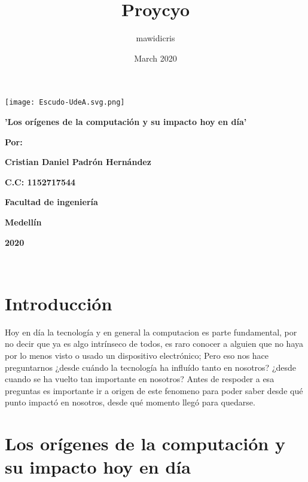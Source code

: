 \documentclass{article}
\title{Proycyo}
\author{mawidicris }
\date{March 2020}
\begin{document}
\begin{center}
\texttt{[image: Escudo-UdeA.svg.png]}
\end{center}
\vspace{50pt}
\begin{center}
\bf{\sc\Large 'Los orígenes de la computación y su impacto hoy en día'}\\
\end{center}
\vspace{50pt}
\begin{center}
\begin{center}
\bf{\sc\large Por:}\\
\end{center}
\bf{\sc\large Cristian Daniel Padrón Hernández}\\
\end{center}
\begin{center}

\bf{\sc\large C.C: 1152717544}\\
\end{center}
\vspace{50pt}
\begin{center}
\bf{\sc\large Facultad de ingeniería}\\
\end{center}
\begin{center}
\bf{\sc\large Medellín}
\end{center}
\begin{center}
\bf{\sc\large 2020}\\
\end{center}\



\newpage
\Large
\section{Introducción}
 Hoy en día la tecnología y en general la computacion es parte fundamental, por no decir que ya es algo intrínseco de todos, es raro conocer a alguien que no haya por lo menos visto o usado un dispositivo electrónico; Pero eso nos hace preguntarnos ¿desde cuándo la tecnología ha influído tanto en nosotros? ¿desde cuando se ha vuelto tan importante en nosotros? 
\newline
Antes de respoder a esa preguntas es importante ir a origen de este fenomeno para poder saber desde qué punto impactó en nosotros, desde qué momento llegó para quedarse. 

\newpage
\Large
\section{Los orígenes de la computación y su impacto hoy en día}
\end{document}
